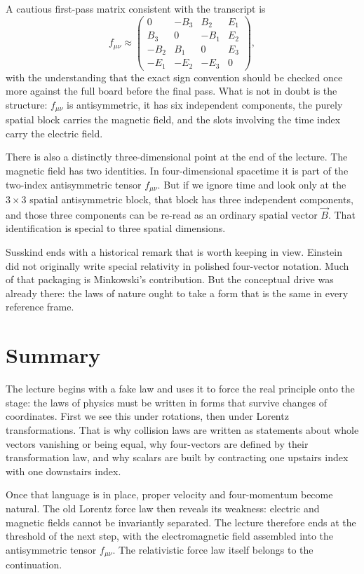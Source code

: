 A cautious first-pass matrix consistent with the transcript is
\begin{equation}
f_{\mu\nu}\approx
\begin{pmatrix}
0 & -B_3 & B_2 & E_1\\
B_3 & 0 & -B_1 & E_2\\
-B_2 & B_1 & 0 & E_3\\
-E_1 & -E_2 & -E_3 & 0
\end{pmatrix},
\end{equation}
with the understanding that the exact sign convention should be checked once more against the full board before the final pass. What is not in doubt is the structure: \(f_{\mu\nu}\) is antisymmetric, it has six independent components, the purely spatial block carries the magnetic field, and the slots involving the time index carry the electric field.

There is also a distinctly three-dimensional point at the end of the lecture. The magnetic field has two identities. In four-dimensional spacetime it is part of the two-index antisymmetric tensor \(f_{\mu\nu}\). But if we ignore time and look only at the \(3\times 3\) spatial antisymmetric block, that block has three independent components, and those three components can be re-read as an ordinary spatial vector \(\vec B\). That identification is special to three spatial dimensions.

Susskind ends with a historical remark that is worth keeping in view. Einstein did not originally write special relativity in polished four-vector notation. Much of that packaging is Minkowski's contribution. But the conceptual drive was already there: the laws of nature ought to take a form that is the same in every reference frame.

\section{Summary}

The lecture begins with a fake law and uses it to force the real principle onto the stage: the laws of physics must be written in forms that survive changes of coordinates. First we see this under rotations, then under Lorentz transformations. That is why collision laws are written as statements about whole vectors vanishing or being equal, why four-vectors are defined by their transformation law, and why scalars are built by contracting one upstairs index with one downstairs index.

Once that language is in place, proper velocity and four-momentum become natural. The old Lorentz force law then reveals its weakness: electric and magnetic fields cannot be invariantly separated. The lecture therefore ends at the threshold of the next step, with the electromagnetic field assembled into the antisymmetric tensor \(f_{\mu\nu}\). The relativistic force law itself belongs to the continuation.
